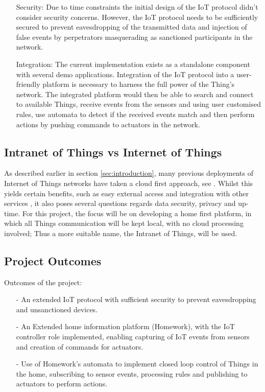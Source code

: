\documentclass{mprop}
\begin{document}
\begin{itemize}
    \item [Security:] Due to time constraints the initial design of the IoT protocol didn't consider security concerns. However, the IoT protocol needs to be sufficiently secured to prevent eavesdropping of the transmitted data and injection of false events by perpetrators masquerading as sanctioned participants in the network. 
    \item [Integration:] The current implementation exists as a standalone component with several demo applications. Integration of the IoT protocol into a user-friendly platform is necessary to harness the full power of the Thing's network. The integrated platform would then be able to search and connect to available Things, receive events from the sensors and using user customised rules, use automata to detect if the received events match and then perform actions by pushing commands to actuators in the network.
\end{itemize}

\subsection{Intranet of Things vs Internet of Things} %
\label{sub:intranet_of_things}

As described earlier in section \ref{sec:introduction}, many previous deployments of Internet of Things networks have taken a cloud first approach, see \cite{SmartThings, Twine}. Whilst this yields certain benefits, such as easy external access and integration with other services \cite{IFTTT, Xively}, it also poses several questions regards data security, privacy and up-time. For this project, the focus will be on developing a home first platform, in which all Things communication will be kept local, with no cloud processing involved; Thus a more suitable name, the Intranet of Things, will be used. 


\subsection{Project Outcomes} %
\label{sub:project_outcomes}

Outcomes of the project:
\begin{itemize}
  \item[-] An extended IoT protocol with sufficient security to prevent eavesdropping and unsanctioned devices.
  \item[-] An Extended home information platform (Homework), with the IoT controller role implemented, enabling capturing of IoT events from sensors and creation of commands for actuators.
  \item[-] Use of Homework's automata to implement closed loop control of Things in the home, subscribing to sensor events, processing rules and publishing to actuators to perform actions.
\end{itemize}
\end{document}
